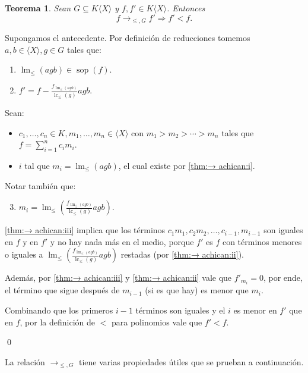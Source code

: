 \documentclass[12pt]{report}
\theoremstyle{customstyle}
\newtheorem{theorem}{Teorema}[chapter]
\renewenvironment{proof}[1][\proofname]{{\noindent \bfseries #1: }}{\qed} %
\theoremstyle{factstyle}
\DeclareMathOperator{\sop}{sop}
\DeclareMathOperator{\lm}{lm}
\DeclareMathOperator{\lc}{lc}
\begin{document}
\begin{theorem}\label{thm:→ achican}
  Sean $G ⊆ K⟨X⟩$ y $f, f' ∈ K⟨X⟩$. Entonces
  \[ f →_{≤, G} f' ⇒ f' < f \text{.} \]
\end{theorem}
\begin{proof}
  Supongamos el antecedente. Por definición de reducciones tomemos $a, b ∈ ⟨X⟩, g ∈ G$ tales que:
  \begin{enumerate}[label=(\roman*)]
    \item $\lm_≤(agb) ∈ \sop(f)$. \label{thm:→ achican:i}
    \item $f' = f - \frac{f_{\lm_≤(agb)}}{\lc_≤(g)}agb$. \label{thm:→ achican:ii}
  \end{enumerate}

  Sean:
  \begin{itemize}
    \item $c_1, …, c_n ∈ K, m_1, …, m_n ∈ ⟨X⟩$ con $m_1 > m_2 > ⋯ > m_n$ tales que $f = ∑_{i = 1}^n c_i m_i$.
    \item $i$ tal que $m_i = \lm_≤(agb)$, el cual existe por \ref{thm:→ achican:i}.
  \end{itemize}

  Notar también que:

  \begin{enumerate}[label=(\roman*)]
    \setcounter{enumi}{2}
    \item $m_i = \lm_≤(\frac{f_{\lm_≤(agb)}}{\lc_≤(g)}agb)$. \label{thm:→ achican:iii}
  \end{enumerate}

  \ref{thm:→ achican:iii} implica que los términos $c_1 m_1, c_2 m_2, …, c_{i-1}, m_{i-1}$ son iguales en $f$ y en $f'$ y no hay nada más en el medio, porque $f'$ es $f$ con términos menores o iguales a $\lm_≤(\frac{f_{\lm_≤(agb)}}{\lc_≤(g)}agb)$ restadas (por \ref{thm:→ achican:ii}).

  Además, por \ref{thm:→ achican:iii} y \ref{thm:→ achican:ii} vale que $f'_{m_i} = 0$, por ende, el término que sigue después de $m_{i-1}$ (si es que hay) es menor que $m_i$.

  Combinando que los primeros $i - 1$ términos son iguales y el $i$ es menor en $f'$ que en $f$, por la definición de $<$ para polinomios vale que $f' < f$.

\end{proof}

La relación $→_{≤, G}$ tiene varias propiedades útiles que se prueban a continuación.
\end{document}
